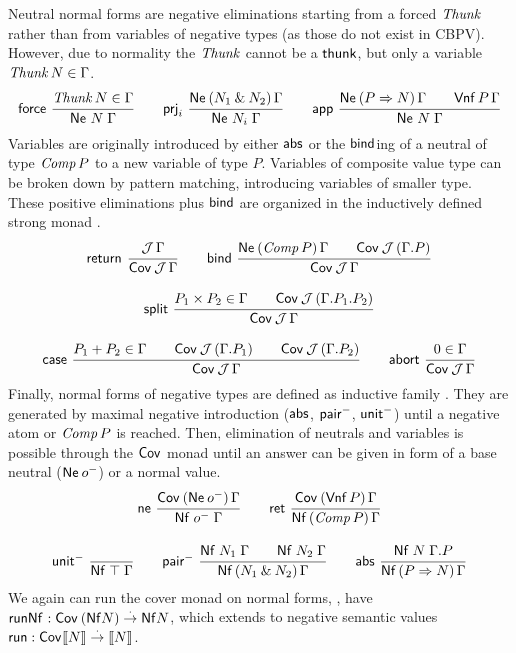 \documentclass[a4paper,USenglish,cleveref, autoref]{lipics-v2019}
\begin{document}
Neutral normal forms  are negative eliminations
starting from a forced $\mathit{Thunk}$ rather than from variables of negative
types (as those do not exist in CBPV).  However, due to normality
the $\mathit{Thunk}$ cannot be a $\mathsf{thunk}$, but only a variable
$\mathit{Thunk}\,N \in \Gamma$.
\begin{gather*}
  \nru{\tforce}{\Thunk N \in \Gamma}{\Ne N \Gamma}
\qquad
  \nru{\tprj_i}
      {\NeP {N_1 \ntimes N_2} \Gamma}
      {\Ne {N_i} \Gamma}
\qquad
  \nru{\tapp}
      {\NeP {P \To N} \Gamma \qquad \PValNf P \Gamma}
      {\Ne N \Gamma}
\end{gather*}
Variables are originally introduced by either $\mathsf{abs}$ or
the $\mathsf{bind}$ing of a neutral of type $\mathit{Comp}\,P$ to a new variable of type
$P$.  Variables of composite value type can be broken down by pattern
matching, introducing variables of smaller type.  These positive
eliminations plus $\mathsf{bind}$ are organized in the
inductively defined strong monad \fbox{$\Cov$}.
\begin{gather*}
  \nru{\treturn}{\J\,\Gamma}{\Cover \J \Gamma}
\qquad
  \nru{\tbind}
      {\NeP {\Comp P} \Gamma \qquad \Cover \J (\cext \Gamma P)}
      {\Cover \J \Gamma}
\\[2ex]
  \nru{\tsplit}
      {P_1 \times P_2 \in \Gamma \qquad
       \Cover \J (\cext {\cext \Gamma {P_1}} {P_2})
      }
      {\Cover \J \Gamma}
\\[2ex]
  \nru{\tcase}
      {P_1 + P_2 \in \Gamma
       \qquad \Cover \J (\cext \Gamma {P_1})
       \qquad \Cover \J (\cext \Gamma {P_2})
      }
      {\Cover \J \Gamma}
\qquad
  \nru{\tabort}
      {\tyempty \in \Gamma}
      {\Cover \J \Gamma}
\end{gather*}
Finally, normal forms of negative types are defined as inductive
family .  They are generated by maximal negative
introduction ($\mathsf{abs}$, $\mathsf{pair}^-$, $\mathsf{unit}^-$) until a negative atom or
$\mathit{Comp}\,P$ is reached.  Then, elimination of neutrals and variables is
possible through the $\Cov$ monad until an answer can be given in form
of a base neutral ($\mathsf{Ne}^{}\,o^-$) or a normal value.
\begin{gather*}
  \nru{\tne}
      {\CoverP {\tNe\,\natom} \Gamma}
      {\Nf {\natom} \Gamma}
\qquad
  \nru{\tret}
      {\CoverP {\tVNf\,P}  \Gamma}
      {\NfP {\Comp P} \Gamma}
\\[2ex]
  \nru{\nunit}{}{\Nf \top \Gamma}
\qquad
  \nru{\npair}
      {\Nf {N_1} \Gamma \qquad \Nf {N_2} \Gamma}
      {\NfP {N_1 \ntimes N_2} \Gamma}
\qquad
  \nru{\tabs}
      {\Nf N {\cext \Gamma P}}
      {\NfP {P \To N} \Gamma}
\end{gather*}
We again can run the cover monad on normal forms, \ie, have
$\mathsf{runNf}^{} : \mathsf{Cov}^{}\,(\mathsf{Nf} N) \stackrel{\cdot}{\to} \mathsf{Nf} N$, which extends to
negative semantic values
$\mathsf{run} : \mathsf{Cov}^{} \mathopen{{[\kern-0.14em[}} N \mathclose{{]\kern-0.14em]}} \stackrel{\cdot}{\to} \mathopen{{[\kern-0.14em[}} N \mathclose{{]\kern-0.14em]}}$.
\end{document}

